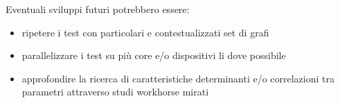 \documentclass[a4paper]{article}
\begin{document}
Eventuali sviluppi futuri potrebbero essere:
\begin{itemize}
\item ripetere i test con particolari e contestualizzati set di grafi
\item parallelizzare i test su più core e/o dispositivi li dove possibile
\item approfondire la ricerca di caratteristiche determinanti e/o correlazioni tra parametri attraverso studi workhorse mirati
\end{itemize}
\end{document}
